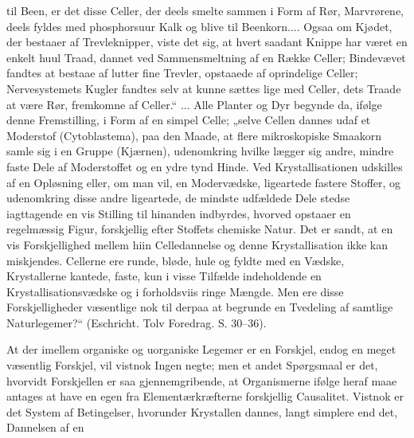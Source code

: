 \documentclass[12pt,a4paper]{book}
\begin{document}
til Been, er det disse Celler, der deels smelte sammen i Form af Rør,
Marvrørene, deels fyldes med phosphorsuur Kalk og blive til Beenkorn....
Ogsaa om Kjødet, der bestaaer af Trevleknipper, viste det sig, at hvert
saadant Knippe har været en enkelt huul Traad, dannet ved Sammensmeltning
af en Række Celler; Bindevævet fandtes at bestaae af lutter fine Trevler,
opstaaede af oprindelige Celler; Nervesystemets Kugler fandtes selv at
kunne sættes lige med Celler, dets Traade at være Rør, fremkomne af
Celler.“ ... Alle Planter og Dyr begynde da, ifølge denne Fremstilling, i
Form af en simpel Celle; „selve Cellen dannes udaf et Moderstof
(Cytoblastema), paa den Maade, at flere mikroskopiske Smaakorn samle sig
i en Gruppe (Kjærnen), udenomkring hvilke lægger sig andre, mindre faste
Dele af Moderstoffet og en ydre tynd Hinde. Ved Krystallisationen
udskilles af en Opløsning eller, om man vil, en Modervædske, ligeartede
fastere Stoffer, og udenomkring disse andre ligeartede, de mindste
udfældede Dele stedse iagttagende en vis Stilling til hinanden indbyrdes,
hvorved opstaaer en regelmæssig Figur, forskjellig efter Stoffets
chemiske Natur. Det er sandt, at en vis Forskjellighed mellem hiin
Celledannelse og denne Krystallisation ikke kan miskjendes. Cellerne ere
runde, bløde, hule og fyldte med en Vædske, Krystallerne kantede, faste,
kun i visse Tilfælde indeholdende en Krystallisationsvædske og i
forholdsviis ringe Mængde. Men ere disse Forskjelligheder væsentlige nok
til derpaa at begrunde en Tvedeling af samtlige Naturlegemer?“
(Eschricht. Tolv Foredrag. S. 30--36).

At der imellem organiske og uorganiske Legemer er en Forskjel, endog en
meget væsentlig Forskjel, vil vistnok Ingen negte; men et andet
Spørgsmaal er det, hvorvidt Forskjellen er saa gjennemgribende, at
Organismerne ifølge heraf maae antages at have en egen fra
Elementærkræfterne forskjellig Causalitet. Vistnok er det System af
Betingelser, hvorunder Krystallen dannes, langt simplere end det,
Dannelsen af en
\end{document}
